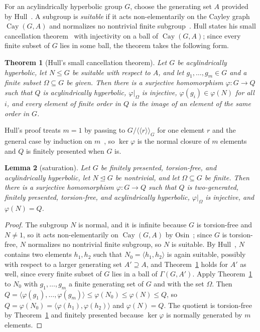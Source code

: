 \documentclass[11pt]{amsart}
\newtheorem{theorem}{Theorem}[section]
\newtheorem{lemma}[theorem]{Lemma}
\theoremstyle{plain}
\newcommand{\normal}[1]{\langle\!\langle #1\rangle\!\rangle}
\begin{document}
For an acylindrically hyperbolic group $G$, choose the generating set $A$
provided by Hull~\cite[Theorem~3.12]{Hull}.  A subgroup is \emph{suitable}
if it acts non-elementarily on the Cayley graph $\operatorname{Cay}(G,A)$ and normalizes no nontrivial
finite subgroup~\cite[Definition~1.4]{Hull}.  Hull states his small cancellation theorem~\cite[Theorem~7.1]{Hull}
with injectivity on a ball of $\operatorname{Cay}(G,A)$; since every finite subset
of $G$ lies in some ball, the theorem takes the following form.

\begin{theorem}[Hull's small cancellation theorem]\label{thm:hull}
Let $G$ be acylindrically hyperbolic, let $N\le G$ be suitable with respect
to $A$, and let $g_1,\dots,g_m\in G$ and a finite subset $\Omega\subseteq G$
be given.  Then there is a surjective homomorphism $\varphi\colon G\to Q$
such that $Q$ is acylindrically hyperbolic, $\varphi|_\Omega$ is injective,
$\varphi(g_i)\in\varphi(N)$ for all $i$, and every element of finite order
in $Q$ is the image of an element of the same order in $G$.
\end{theorem}

Hull's proof treats $m=1$ by passing to $G/\normal{r}_G$ for one
element $r$ and the general case by induction on $m$~\cite[proof of Theorem~7.1]{Hull},
so $\ker\varphi$ is the normal closure of $m$ elements and $Q$ is finitely
presented when $G$ is.

\begin{lemma}[saturation]\label{lem:saturation}
Let $G$ be finitely presented, torsion-free, and acylindrically hyperbolic,
let $N\trianglelefteq G$ be nontrivial, and let $\Omega\subseteq G$ be finite.
Then there is a surjective homomorphism $\varphi\colon G\to Q$ such that $Q$
is two-generated, finitely presented, torsion-free, and acylindrically
hyperbolic, $\varphi|_\Omega$ is injective, and $\varphi(N)=Q$.
\end{lemma}

\begin{proof}
The subgroup $N$ is normal, and it is infinite because $G$ is
torsion-free and $N\ne1$, so it acts non-elementarily on
$\operatorname{Cay}(G,A)$ by Osin~\cite[Lemma~7.1]{Osin}; since $G$ is torsion-free,
$N$ normalizes no nontrivial finite subgroup, so $N$ is suitable.  By Hull~\cite[Corollary~5.7 and Lemma~5.8]{Hull}, $N$ contains
two elements $h_1,h_2$ such that $N_0=\langle h_1,h_2\rangle$ is again
suitable, possibly with respect to a larger generating set
$A'\supseteq A$, and Theorem~\ref{thm:hull} holds for $A'$ as well,
since every finite subset of $G$ lies in a ball of $\Gamma(G,A')$.  Apply
Theorem~\ref{thm:hull} to $N_0$ with $g_1,\dots,g_m$ a
finite generating set of $G$ and with the set $\Omega$.  Then
$Q=\langle\varphi(g_1),\dots,\varphi(g_m)\rangle\le\varphi(N_0)\le\varphi(N)\le Q$,
so $Q=\varphi(N_0)=\langle\varphi(h_1),\varphi(h_2)\rangle$ and
$\varphi(N)=Q$.  The quotient is torsion-free by Theorem~\ref{thm:hull} and
finitely presented because $\ker\varphi$ is normally generated by $m$
elements.
\end{proof}
\end{document}
